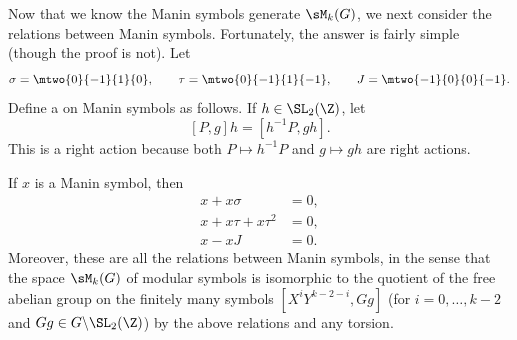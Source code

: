 Now that we know the Manin symbols generate $\sM_k(G)$, we
next consider the relations between Manin symbols.  Fortunately,
the answer is fairly simple (though the proof is not).  Let
$$
\sigma = \mtwo{0}{-1}{1}{\hfill 0},\qquad
\tau = \mtwo{0}{-1}{1}{-1}, \qquad
J = \mtwo{-1}{\hfill 0}{\hfill 0}{-1}.
$$
Define a  on Manin symbols
as follows.  If $h \in \SL_2(\Z)$, let
$$
   [P, g]h = [h^{-1} P, gh].
$$
This is a right action because both $P\mapsto h^{-1}P$ 
and $g\mapsto gh$ are right actions.
\begin{theorem}\label{thm:mansym}
If $x$ is a Manin symbol, then
\begin{align}
x + x\sigma &= 0,\\
x + x\tau + x\tau^{2} &= 0,\\
x - xJ &= 0.
\end{align}
Moreover, these are all the relations between Manin symbols, in the
sense that the space $\sM_k(G)$ of modular symbols is isomorphic to
the quotient of the free abelian group on the finitely many symbols
$[X^{i}Y^{k-2-i},Gg]$ (for $i=0,\ldots, k-2$ and 
$Gg \in G\backslash \SL_2(\Z)$) by the above relations and any torsion.
\end{theorem}
